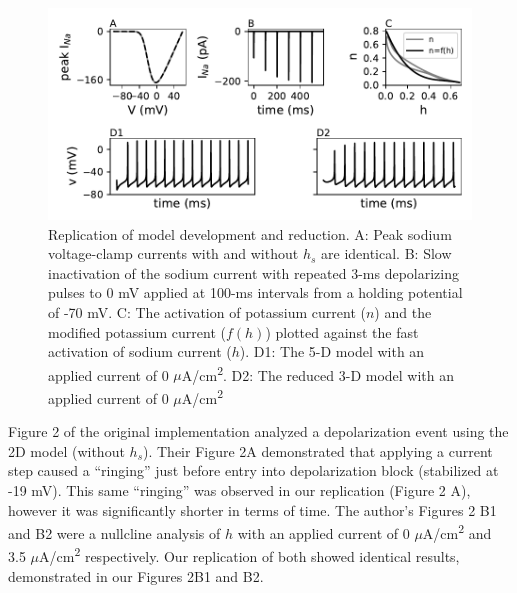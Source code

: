 \begin{figure}
	\centering
	\includegraphics[scale=0.7]{../figures/figure_1.pdf}
	\caption{Replication of model development and reduction. A: Peak sodium voltage-clamp currents with and without $h_{s}$ are identical. B: Slow inactivation of the sodium current with repeated 3-ms depolarizing pulses to 0 mV applied at 100-ms intervals from a holding potential of -70 mV. C: The activation of potassium current ($n$) and the modified potassium current ($f(h)$) plotted against the fast activation of sodium current ($h$). D1: The 5-D model with an applied current of 0 $\mu$A/cm\textsuperscript{2}. D2: The reduced 3-D model with an applied current of 0 $\mu$A/cm\textsuperscript{2}}
	\label{fig:1}
\end{figure}

Figure 2 of the original implementation analyzed a depolarization event using the 2D model (without $h_s$). Their Figure 2A demonstrated that applying a current step caused a “ringing” just before entry into depolarization block (stabilized at -19 mV). This same “ringing” was observed in our replication (Figure 2 A), however it was significantly shorter in terms of time. The author's Figures 2 B1 and B2 were a nullcline analysis of $h$ with an applied current of 0 $\mu$A/cm\textsuperscript{2} and 3.5 $\mu$A/cm\textsuperscript{2} respectively. Our replication of both showed identical results, demonstrated in our Figures 2B1 and B2.\\ 

